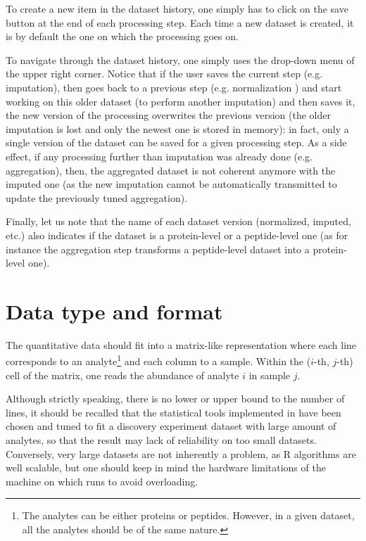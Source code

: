 \documentclass[12pt]{article}
\begin{document}
To create a new item in the dataset history, one simply has to click on the save button at the end of each processing step. 
Each time a new dataset is  created, it is by default the one on which the processing goes on.

To navigate through the dataset history, one simply uses the drop-down menu of the upper right corner. Notice that 
if the user saves the current step (e.g.  
imputation), then goes back to a previous step (e.g. normalization 
) and start working on this older dataset (to perform
another imputation) and then saves it, the new version of the processing 
overwrites the previous version (the older imputation is lost and only the 
newest one is stored in memory): in fact, only a single version of the 
dataset can be saved for a given processing step. As a side effect, if any processing further than imputation was already done
(e.g. aggregation), then, the aggregated dataset is not coherent anymore with the imputed one (as the new imputation cannot be
automatically transmitted to update the previously tuned aggregation).

Finally, let us note that the name of each dataset version (normalized, imputed, etc.) also indicates if the dataset is a protein-level
or a peptide-level one (as for instance the aggregation step transforms a peptide-level dataset into a protein-level one).

\section{Data type and format}\label{sec:dataformat}
The quantitative data should fit into a matrix-like representation where each line corresponds to an analyte\footnote{The analytes can be either proteins or peptides. However, in a given dataset, all the analytes should be of the same nature.} and each column to a sample. Within the ($i$-th, $j$-th) cell of the matrix, one reads the abundance of analyte $i$ in sample $j$.

Although strictly speaking, there is no lower or upper bound to the number of lines, it should be recalled that the statistical tools implemented in  have been chosen and tuned to fit a discovery experiment dataset with large amount of analytes, so that the result may lack of reliability on too small datasets. Conversely, very large datasets are not inherently a problem, as R algorithms are well scalable, but one should keep in mind the hardware limitations of the machine on which  runs to avoid overloading. 
\end{document}
